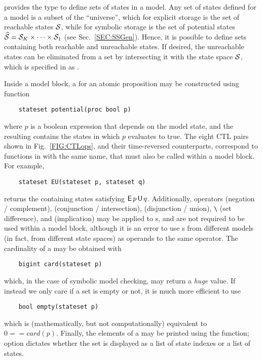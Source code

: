 {\smart} provides the type  to define sets of states in a model. 
Any set of states defined for a model is a subset of the ``universe'', 
which for explicit storage is the set of reachable states $\mathcal{S}$,
while for symbolic storage is the set of potential states $\widehat{\mathcal{S}} = \mathcal{S}_K \times \cdots \times \mathcal{S}_1$
(see Sec.~\ref{SEC:SSGen}).
Hence, it is possible to define sets containing both reachable and unreachable states. 
If desired, the
unreachable states can be eliminated from a set by intersecting it with
the state space $\mathcal{S}$, which is specified in {\smart} as
.

Inside a model block, 
a  for an atomic proposition may be constructed using function
\begin{lstlisting}
    stateset potential(proc bool p)
\end{lstlisting}
where $p$ is a boolean expression that depends on the model state,
and the resulting  contains the states in which $p$
evaluates to true.
The eight CTL pairs shown in Fig.~\ref{FIG:CTLops},
and their time-reversed counterparts,
correspond to functions in {\smart} with the same name,
that must also be called within a model block.
For example,
\begin{lstlisting}
    stateset EU(stateset p, stateset q)
\end{lstlisting}
returns the  containing states
satisfying $\mathsf{E}\,p\,\mathsf{U}\,q$.
Additionally,
operators \Code{!} (negation / complement), \Code{\&} (conjunction / intersection), 
\Code{|} (disjunction / union), \verb|\| (set difference), and \Code{->} (implication)
may be applied to s,
and are not required to be used within a model block,
although
it is an error to use s from different models
(in fact, from different state spaces)
as operands to the same operator.
The cardinality of a  may be obtained with
\begin{lstlisting}
    bigint card(stateset p)
\end{lstlisting}
which, in the case of symbolic model checking,
may return a \emph{huge} value.
If instead we only care if a set is empty or not,
it is much more efficient to use
\begin{lstlisting}
    bool empty(stateset p)
\end{lstlisting}
which is (mathematically, but not computationally)
equivalent to $0==card(p)$.
Finally,
the elements of a  may be printed
using the  function;
option 
dictates whether the set is displayed as a list of state indexes
or a list of states.


